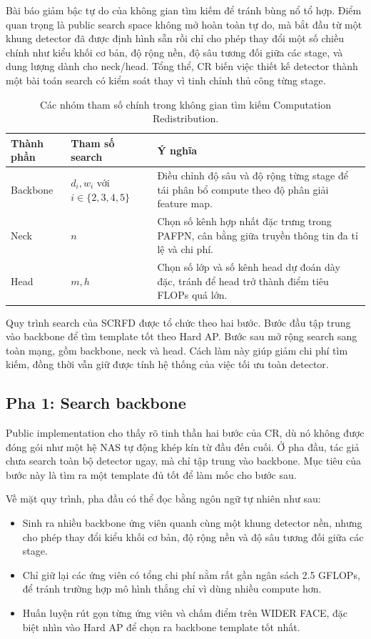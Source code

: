 Bài báo giảm bậc tự do của không gian tìm kiếm để tránh bùng nổ tổ hợp. Điểm quan trọng là public search space không mở hoàn toàn tự do, mà bắt đầu từ một khung detector đã được định hình sẵn rồi chỉ cho phép thay đổi một số chiều chính như kiểu khối cơ bản, độ rộng nền, độ sâu tương đối giữa các stage, và dung lượng dành cho neck/head. Tổng thể, CR biến việc thiết kế detector thành một bài toán search có kiểm soát thay vì tinh chỉnh thủ công từng stage. \cite{guo2022scrfd}

\begin{table}[H]
\centering
\caption{Các nhóm tham số chính trong không gian tìm kiếm Computation Redistribution.}
\small
\begin{tabular}{@{}p{}p{}p{}@{}}
\toprule
\textbf{Thành phần} & \textbf{Tham số search} & \textbf{Ý nghĩa} \\
\midrule
Backbone & \(d_i, w_i\) với \(i\in\{2,3,4,5\}\) & Điều chỉnh độ sâu và độ rộng từng stage để tái phân bổ compute theo độ phân giải feature map. \\
\midrule
Neck & \(n\) & Chọn số kênh hợp nhất đặc trưng trong PAFPN, cân bằng giữa truyền thông tin đa tỉ lệ và chi phí. \\
\midrule
Head & \(m, h\) & Chọn số lớp và số kênh head dự đoán dày đặc, tránh để head trở thành điểm tiêu FLOPs quá lớn. \\
\bottomrule
\end{tabular}
\end{table}

Quy trình search của SCRFD được tổ chức theo hai bước. Bước đầu tập trung vào backbone để tìm template tốt theo Hard AP. Bước sau mở rộng search sang toàn mạng, gồm backbone, neck và head. Cách làm này giúp giảm chi phí tìm kiếm, đồng thời vẫn giữ được tính hệ thống của việc tối ưu toàn detector.

\subsection{Pha 1: Search backbone}

Public implementation cho thấy rõ tinh thần hai bước của CR, dù nó không được đóng gói như một hệ NAS tự động khép kín từ đầu đến cuối. Ở pha đầu, tác giả chưa search toàn bộ detector ngay, mà chỉ tập trung vào backbone. Mục tiêu của bước này là tìm ra một template đủ tốt để làm mốc cho bước sau.

Về mặt quy trình, pha đầu có thể đọc bằng ngôn ngữ tự nhiên như sau:
\begin{itemize}
  \item Sinh ra nhiều backbone ứng viên quanh cùng một khung detector nền, nhưng cho phép thay đổi kiểu khối cơ bản, độ rộng nền và độ sâu tương đối giữa các stage.
  \item Chỉ giữ lại các ứng viên có tổng chi phí nằm rất gần ngân sách 2.5 GFLOPs, để tránh trường hợp mô hình thắng chỉ vì dùng nhiều compute hơn.
  \item Huấn luyện rút gọn từng ứng viên và chấm điểm trên WIDER FACE, đặc biệt nhìn vào Hard AP để chọn ra backbone template tốt nhất.
\end{itemize}

